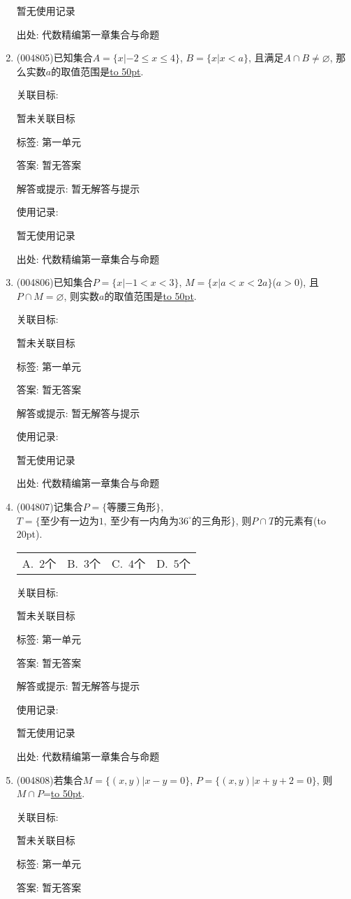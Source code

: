 \documentclass[10pt,a4paper]{article}
\newcommand{\blank}[1]{\underline{\hbox to #1pt{}}}
\newcommand{\bracket}[1]{(\hbox to #1pt{})}
\newcommand{\fourch}[4]{\par\begin{tabular}{p{.23\textwidth}p{.23\textwidth}p{.23\textwidth}p{.23\textwidth}}
A.~#1 &B.~#2& C.~#3& D.~#4
\end{tabular}}
\begin{document}
\begin{enumerate}[1.]
暂无使用记录


出处: 代数精编第一章集合与命题
\item { (004805)}已知集合$A=\{x|-2\le x\le 4\}$, $B=\{x|x<a\}$, 且满足$A\cap B\ne \varnothing$, 那么实数$a$的取值范围是\blank{50}.


关联目标:

暂未关联目标



标签: 第一单元

答案: 暂无答案

解答或提示: 暂无解答与提示

使用记录:

暂无使用记录


出处: 代数精编第一章集合与命题
\item { (004806)}已知集合$P=\{x|-1<x<3\}$, $M=\{x|a<x<2a\}$($a>0$), 且$P\cap M=\varnothing$, 则实数$a$的取值范围是\blank{50}.


关联目标:

暂未关联目标



标签: 第一单元

答案: 暂无答案

解答或提示: 暂无解答与提示

使用记录:

暂无使用记录


出处: 代数精编第一章集合与命题
\item { (004807)}记集合$P=\{\text{等腰三角形}\}$, $T=\{\text{至少有一边为}1, \ \text{至少有一内角为}36^\circ\text{的三角形}\}$, 则$P\cap T$的元素有\bracket{20}.
\fourch{$2$个}{$3$个}{$4$个}{$5$个}


关联目标:

暂未关联目标



标签: 第一单元

答案: 暂无答案

解答或提示: 暂无解答与提示

使用记录:

暂无使用记录


出处: 代数精编第一章集合与命题
\item { (004808)}若集合$M=\{(x,y)|x-y=0\}$, $P=\{(x,y)|x+y+2=0\}$, 则$M\cap P$=\blank{50}.


关联目标:

暂未关联目标



标签: 第一单元

答案: 暂无答案


\end{enumerate}
\end{document}
